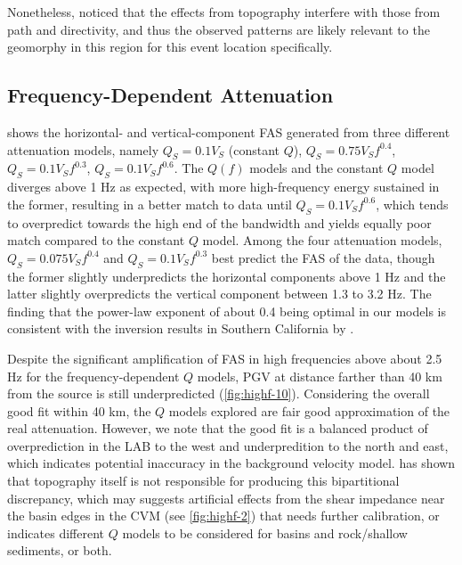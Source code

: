 Nonetheless, \citet{leeEffectsRealisticSurface2009} noticed that the effects from topography interfere with those from path and directivity, and thus the observed patterns are likely relevant to the geomorphy in this region for this event location specifically.


\subsection{Frequency-Dependent Attenuation}\label{highf:qf}
 shows the horizontal- and vertical-component FAS generated from three different attenuation models, namely $Q_S=0.1V_S$ (constant $Q$), $Q_S=0.75V_Sf^{0.4}$, $Q_S=0.1V_Sf^{0.3}$, $Q_S=0.1V_Sf^{0.6}$. The $Q(f)$ models and the constant $Q$ model diverges above 1 Hz as expected, with more high-frequency energy sustained in the former, resulting in a better match to data until $Q_S=0.1V_Sf^{0.6}$, which tends to overpredict towards the high end of the bandwidth and yields equally poor match compared to the constant $Q$ model. Among the four attenuation models, $Q_S=0.075V_Sf^{0.4}$ and $Q_S=0.1V_Sf^{0.3}$ best predict the FAS of the data, though the former slightly underpredicts the horizontal components above 1 Hz and the latter slightly overpredicts the vertical component between 1.3 to 3.2 Hz. The finding that the power-law exponent of about 0.4 being optimal in our models is consistent with the inversion results in Southern California by \citet{linFrequencyDependentAttenuationWaves2018}.


Despite the significant amplification of FAS in high frequencies above about 2.5 Hz for the frequency-dependent $Q$ models, PGV at distance farther than 40 km from the source is still underpredicted (\cref{fig:highf-10}). Considering the overall good fit within 40 km, the $Q$ models explored are fair good approximation of the real attenuation. However, we note that the good fit is a balanced product of overprediction in the LAB to the west and underpredition to the north and east, which indicates potential inaccuracy in the background velocity model.  has shown that topography itself is not responsible for producing this bipartitional discrepancy, which may suggests artificial effects from the shear impedance near the basin edges in the CVM (see \cref{fig:highf-2}) that needs further calibration, or indicates different $Q$ models to be considered for basins and rock/shallow sediments, or both.

